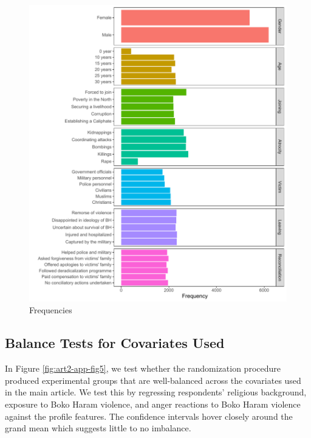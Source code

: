 \begin{figure}[H]
\includegraphics[scale=0.65]{Appendices/Appendix_chapter_3/art2-app-figure4.pdf}
\caption{Frequencies}
\label{fig:art2-app-fig4}
\end{figure}

\newpage
\subsection{Balance Tests for Covariates Used}
In Figure \ref{fig:art2-app-fig5}, we test whether the randomization procedure produced experimental groups that are well-balanced across the covariates used in the main article. We test this by regressing respondents' religious background, exposure to Boko Haram violence, and anger reactions to Boko Haram violence against the profile features. The confidence intervals hover closely around the grand mean which suggests little to no imbalance. 
\vspace{3mm}

